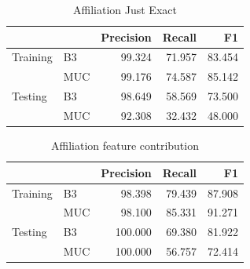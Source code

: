 \documentclass[twocolumn,letterpaper]{article}
\begin{document}
\begin{table}[ht]
\centering
\begin{tabular}{l || l | r r r}
 & & Precision & Recall & F1 \\ \hline
Training & B3 & 99.324 & 71.957 & 83.454 \\
 & MUC & 99.176 & 74.587 & 85.142\\ \hline
Testing & B3 & 98.649 & 58.569 & 73.500 \\
 & MUC & 92.308 & 32.432 & 48.000 \\
\end{tabular}
\caption{Affiliation Just Exact}
\label{tab:exact}
\end{table}

\begin{table}[ht]
\centering
\begin{tabular}{l || l | r r r}
 & & Precision & Recall & F1 \\ \hline
Training & B3 & 98.398 & 79.439 & 87.908 \\
 & MUC & 98.100 & 85.331 & 91.271\\ \hline
Testing & B3 & 100.000 & 69.380 & 81.922 \\
 & MUC & 100.000 & 56.757 & 72.414 \\
\end{tabular}
\caption{Affiliation feature contribution}
\label{tab:aff}
\end{table}

\end{document}
